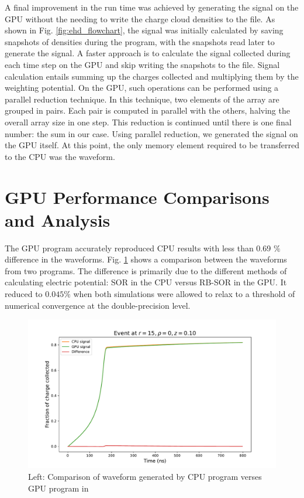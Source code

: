A final improvement in the run time was achieved by generating the signal on the GPU without the needing to write the charge cloud densities to the file. As shown in Fig. \ref{fig:ehd_flowchart}, the signal was initially calculated by saving snapshots of densities during the program, with the snapshots read later to generate the signal. A faster approach is to calculate the signal collected during each time step on the GPU and skip writing the snapshots to the file. Signal calculation entails summing up the charges collected and multiplying them by the weighting potential. On the GPU, such operations can be performed using a parallel reduction technique. In this technique, two elements of the array are grouped in pairs. Each pair is computed in parallel with the others, halving the overall array size in one step. This reduction is continued until there is one final number: the sum in our case. Using parallel reduction, we generated the signal on the GPU itself. At this point, the only memory element required to be transferred to the CPU was the waveform.

\section{GPU Performance Comparisons and Analysis}

The GPU program accurately reproduced CPU results with less than 0.69 $\%$ difference in the waveforms. Fig. \ref{fig:waveform_comp} shows a comparison between the waveforms from two programs. The difference is primarily due to the different methods of calculating electric potential: SOR in the CPU versus RB-SOR in the GPU. It reduced to $0.045\%$ when both simulations were allowed to relax to a threshold of numerical convergence at the double-precision level.

\begin{figure}[!ht]
\centering
 \includegraphics[width=0.99\linewidth]{ch4/figs/cpu_gpu_wf.pdf}
\caption{ Left: Comparison of waveform generated by CPU program verses GPU program in {\tdsim}}
\label{fig:waveform_comp}
\end{figure}

